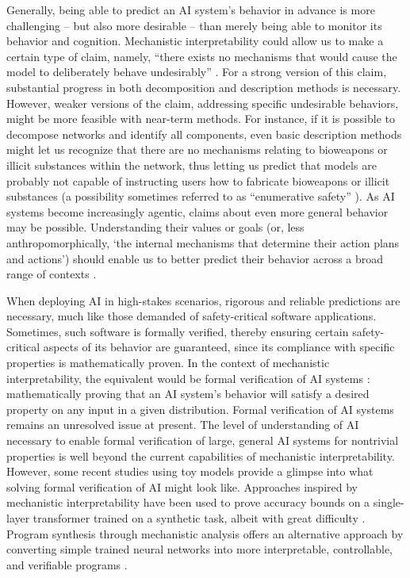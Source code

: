 Generally, being able to predict an AI system's behavior in advance is more challenging -- but also more desirable -- than merely being able to monitor its behavior and cognition. Mechanistic interpretability could allow us to make a certain type of claim, namely, “there exists no mechanisms that would cause the model to deliberately behave undesirably” \citep{olah2023interpretability}. For a strong version of this claim, substantial progress in both decomposition and description methods is necessary. However, weaker versions of the claim, addressing specific undesirable behaviors, might be more feasible with near-term methods. For instance, if it is possible to decompose networks and identify all components, even basic description methods might let us recognize that there are no mechanisms relating to bioweapons or illicit substances within the network, thus letting us predict that models are probably not capable of instructing users how to fabricate bioweapons or illicit substances (a possibility sometimes referred to as “enumerative safety” \citep{elhage2021mathematical, olah2023interpretability}). As AI systems become increasingly agentic, claims about even more general behavior may be possible. Understanding their values or goals (or, less anthropomorphically, `the internal mechanisms that determine their action plans and actions') should enable us to better predict their behavior across a broad range of contexts \citep{colognese2023high}.

When deploying AI in high-stakes scenarios, rigorous and reliable predictions are necessary, much like those demanded of safety-critical software applications. Sometimes, such software is formally verified, thereby ensuring certain safety-critical aspects of its behavior are guaranteed, since its compliance with specific properties is mathematically proven. In the context of mechanistic interpretability, the equivalent would be formal verification of AI systems \citep{dalrymple2024guaranteedsafeaiframework,tegmark2023provablysafesystemspath, critch2020airesearchconsiderationshuman}: mathematically proving that an AI system's behavior will satisfy a desired property on any input in a given distribution. Formal verification of AI systems remains an unresolved issue at present. The level of understanding of AI necessary to enable formal verification of large, general AI systems for nontrivial properties is well beyond the current capabilities of mechanistic interpretability. However, some recent studies using toy models provide a glimpse into what solving formal verification of AI might look like. Approaches inspired by mechanistic interpretability have been used to prove accuracy bounds on a single-layer transformer trained on a synthetic task, albeit with great difficulty \citep{gross2024compactproofsmodelperformance}. Program synthesis through mechanistic analysis offers an alternative approach by converting simple trained neural networks into more interpretable, controllable, and verifiable programs \citep{michaud2024openingaiblackbox}. 

